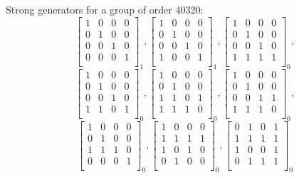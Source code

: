 Strong generators for a group of order 40320:
$$
\left[
\begin{array}{*{4}{r}}
1 & 0 & 0 & 0\\
0 & 1 & 0 & 0\\
0 & 0 & 1 & 0\\
0 & 0 & 0 & 1\\
\end{array}
\right]
_{1}
, 
\left[
\begin{array}{*{4}{r}}
1 & 0 & 0 & 0\\
0 & 1 & 0 & 0\\
0 & 0 & 1 & 0\\
1 & 0 & 0 & 1\\
\end{array}
\right]
_{1}
, 
\left[
\begin{array}{*{4}{r}}
1 & 0 & 0 & 0\\
0 & 1 & 0 & 0\\
0 & 0 & 1 & 0\\
1 & 1 & 1 & 1\\
\end{array}
\right]
_{0}
, 
$$
$$
\left[
\begin{array}{*{4}{r}}
1 & 0 & 0 & 0\\
0 & 1 & 0 & 0\\
0 & 0 & 1 & 0\\
1 & 1 & 0 & 1\\
\end{array}
\right]
_{0}
, 
\left[
\begin{array}{*{4}{r}}
1 & 0 & 0 & 0\\
0 & 1 & 0 & 0\\
1 & 1 & 0 & 1\\
1 & 1 & 1 & 0\\
\end{array}
\right]
_{0}
, 
\left[
\begin{array}{*{4}{r}}
1 & 0 & 0 & 0\\
0 & 1 & 0 & 0\\
0 & 0 & 1 & 1\\
1 & 1 & 1 & 0\\
\end{array}
\right]
_{0}
, 
$$
$$
\left[
\begin{array}{*{4}{r}}
1 & 0 & 0 & 0\\
0 & 1 & 0 & 0\\
1 & 1 & 1 & 0\\
0 & 0 & 0 & 1\\
\end{array}
\right]
_{0}
, 
\left[
\begin{array}{*{4}{r}}
1 & 0 & 0 & 0\\
1 & 1 & 1 & 1\\
1 & 0 & 1 & 0\\
0 & 1 & 0 & 0\\
\end{array}
\right]
_{0}
, 
\left[
\begin{array}{*{4}{r}}
0 & 1 & 0 & 1\\
1 & 1 & 1 & 1\\
1 & 0 & 0 & 1\\
0 & 1 & 1 & 1\\
\end{array}
\right]
_{0}
$$

